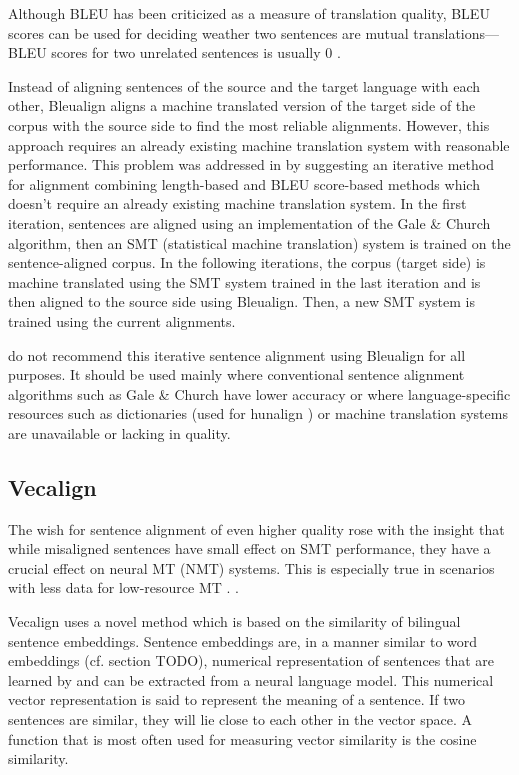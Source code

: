 Although BLEU has been criticized as a measure of translation quality, BLEU scores can be used for deciding weather two sentences are mutual translations---BLEU scores for two unrelated sentences is usually 0 \autocite{sennrich-volk-2010-mt}. 

Instead of aligning sentences of the source and the target language with each other, Bleualign aligns a machine translated version of the target side of the corpus with the source side to find the most reliable alignments. However, this approach requires an already existing machine translation system with reasonable performance. 
This problem was addressed in \cite{sennrich-volk-2011-iterative} by suggesting an iterative method for alignment combining length-based and BLEU score-based methods which doesn't require an already existing machine translation system. 
In the first iteration, sentences are aligned using an implementation of the Gale \& Church algorithm, then an SMT (statistical machine translation) system is trained on the sentence-aligned corpus. 
In the following iterations, the corpus (target side) is machine translated using the SMT system trained in the last iteration and is then aligned to the source side using Bleualign. 
Then, a new SMT system is trained using the current alignments.

\cite{sennrich-volk-2011-iterative} do not recommend this iterative sentence alignment using Bleualign for all purposes. 
It should be used mainly where conventional sentence alignment algorithms such as Gale \& Church have lower accuracy or where language-specific resources such as dictionaries (used for hunalign \autocite{hunalign}) or machine translation systems are unavailable or lacking in quality.

\subsection{Vecalign}
The wish for  sentence alignment of even higher quality rose with the insight that while misaligned sentences have small effect on SMT performance, they have a crucial effect on neural MT (NMT) systems. 
This is especially true in scenarios with less data for low-resource MT \autocite{thompson-koehn-2019-vecalign}. .

Vecalign uses a novel method which is based on the similarity of bilingual sentence embeddings. 
Sentence embeddings are, in a manner similar to word embeddings (cf. section TODO), numerical representation of sentences that are learned by and can be extracted from a neural language model. 
This numerical vector representation is said to represent the meaning of a sentence. 
If two sentences are similar, they will lie close to each other in the vector space. 
A function that is most often used for measuring vector similarity is the cosine similarity.


